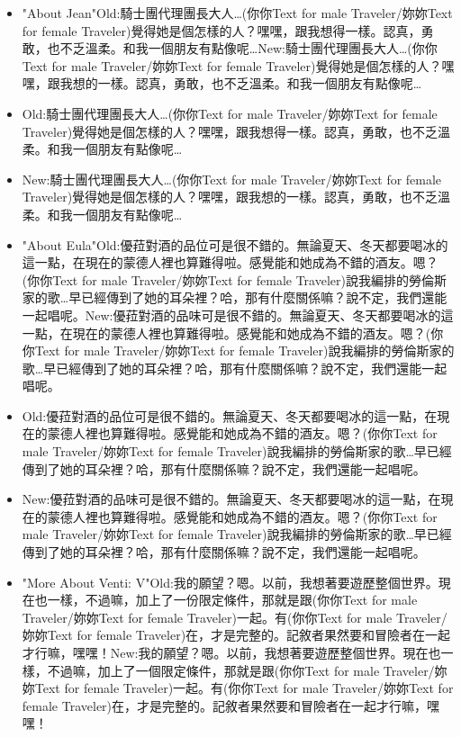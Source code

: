 \documentclass[a4paper,12pt]{article}
\begin{document}
\begin{itemize}
\item "About Jean"Old:騎士團代理團長大人…(‍你你Text for male Traveler/妳妳Text for female Traveler‍)覺得她是個怎樣的人？嘿嘿，跟我想得一樣。認真，勇敢，也不乏溫柔。和我一個朋友有點像呢…New:騎士團代理團長大人…(‍你你Text for male Traveler/妳妳Text for female Traveler‍)覺得她是個怎樣的人？嘿嘿，跟我想的一樣。認真，勇敢，也不乏溫柔。和我一個朋友有點像呢…
\item Old:騎士團代理團長大人…(‍你你Text for male Traveler/妳妳Text for female Traveler‍)覺得她是個怎樣的人？嘿嘿，跟我想得一樣。認真，勇敢，也不乏溫柔。和我一個朋友有點像呢…
\item New:騎士團代理團長大人…(‍你你Text for male Traveler/妳妳Text for female Traveler‍)覺得她是個怎樣的人？嘿嘿，跟我想的一樣。認真，勇敢，也不乏溫柔。和我一個朋友有點像呢…
\item "About Eula"Old:優菈對酒的品位可是很不錯的。無論夏天、冬天都要喝冰的這一點，在現在的蒙德人裡也算難得啦。感覺能和她成為不錯的酒友。嗯？(‍你你Text for male Traveler/妳妳Text for female Traveler‍)說我編排的勞倫斯家的歌…早已經傳到了她的耳朵裡？哈，那有什麼關係嘛？說不定，我們還能一起唱呢。New:優菈對酒的品味可是很不錯的。無論夏天、冬天都要喝冰的這一點，在現在的蒙德人裡也算難得啦。感覺能和她成為不錯的酒友。嗯？(‍你你Text for male Traveler/妳妳Text for female Traveler‍)說我編排的勞倫斯家的歌…早已經傳到了她的耳朵裡？哈，那有什麼關係嘛？說不定，我們還能一起唱呢。
\item Old:優菈對酒的品位可是很不錯的。無論夏天、冬天都要喝冰的這一點，在現在的蒙德人裡也算難得啦。感覺能和她成為不錯的酒友。嗯？(‍你你Text for male Traveler/妳妳Text for female Traveler‍)說我編排的勞倫斯家的歌…早已經傳到了她的耳朵裡？哈，那有什麼關係嘛？說不定，我們還能一起唱呢。
\item New:優菈對酒的品味可是很不錯的。無論夏天、冬天都要喝冰的這一點，在現在的蒙德人裡也算難得啦。感覺能和她成為不錯的酒友。嗯？(‍你你Text for male Traveler/妳妳Text for female Traveler‍)說我編排的勞倫斯家的歌…早已經傳到了她的耳朵裡？哈，那有什麼關係嘛？說不定，我們還能一起唱呢。
\item "More About Venti: V"Old:我的願望？嗯。以前，我想著要遊歷整個世界。現在也一樣，不過嘛，加上了一份限定條件，那就是跟(‍你你Text for male Traveler/妳妳Text for female Traveler‍)一起。有(‍你你Text for male Traveler/妳妳Text for female Traveler‍)在，才是完整的。記敘者果然要和冒險者在一起才行嘛，嘿嘿！New:我的願望？嗯。以前，我想著要遊歷整個世界。現在也一樣，不過嘛，加上了一個限定條件，那就是跟(‍你你Text for male Traveler/妳妳Text for female Traveler‍)一起。有(‍你你Text for male Traveler/妳妳Text for female Traveler‍)在，才是完整的。記敘者果然要和冒險者在一起才行嘛，嘿嘿！

\end{itemize}
\end{document}
